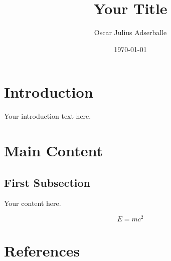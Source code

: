 \documentclass[a4paper, 12pt]{article}
\title{Your Title}
\author{Oscar Julius Adserballe}
\date{\today}
\begin{document}
\maketitle
\tableofcontents
\newpage

\section{Introduction}
Your introduction text here.

\section{Main Content}
\subsection{First Subsection}
Your content here.

\[
    E = mc^2
\]


\section{References}
% 
\end{document}
